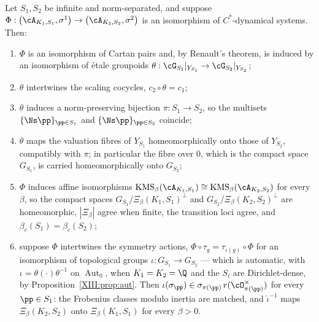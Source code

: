 \begin{theorem}\label{XIII:thm:rec}
Let $S_1,S_2$ be infinite and norm-separated, and suppose
$\Phi:\bigl(\cA_{K_1,S_1},\sigma^1\bigr)\to\bigl(\cA_{K_2,S_2},\sigma^2\bigr)$ is an
isomorphism of $C^*$-dynamical systems. Then:
\begin{enumerate}
\item $\Phi$ is an isomorphism of Cartan pairs and, by Renault's theorem, is induced by an
isomorphism of \'etale groupoids $\theta:\cG_{S_1}|_{Y_{S_1}}\to\cG_{S_2}|_{Y_{S_2}}$;
\item $\theta$ intertwines the scaling cocycles, $c_2\circ\theta=c_1$;
\item $\theta$ induces a norm-preserving bijection $\pi:S_1\to S_2$, so the multisets
$\{\Ns\pp\}_{\pp\in S_1}$ and $\{\Ns\pp\}_{\pp\in S_2}$ coincide;
\item $\theta$ maps the valuation fibres of $Y_{S_1}$ homeomorphically onto those of
$Y_{S_2}$, compatibly with $\pi$; in particular the fibre over $0$, which is the compact
space $G_{S_1}$, is carried homeomorphically onto $G_{S_2}$;
\item $\Phi$ induces affine isomorphisms $\mathrm{KMS}_\beta(\cA_{K_1,S_1})\cong\mathrm{KMS}_\beta(\cA_{K_2,S_2})$
for every $\beta$, so the compact spaces $G_{S_1}/\Xi_\beta(K_1,S_1)^\perp$ and
$G_{S_2}/\Xi_\beta(K_2,S_2)^\perp$ are homeomorphic, $|\Xi_\beta|$ agree when finite, the
transition loci agree, and $\beta_c(S_1)=\beta_c(S_2)$;
\item suppose $\Phi$ intertwines the symmetry actions, $\Phi\circ\tau_g=\tau_{\iota(g)}\circ\Phi$
for an isomorphism of topological groups $\iota:G_{S_1}\to G_{S_2}$ --- which is automatic,
with $\iota=\theta(\cdot)\theta^{-1}$ on $\operatorname{Aut}_0$, when $K_1=K_2=\Q$ and the
$S_i$ are Dirichlet-dense, by Proposition~\ref{XIII:prop:aut}. Then
$\iota(\sigma_\pp)\in\sigma_{\pi(\pp)}\,r(\cO_{\pi(\pp)}^\times)$ for every $\pp\in S_1$: the
Frobenius classes modulo inertia are matched, and $\hat\iota^{-1}$ maps
$\Xi_\beta(K_2,S_2)$ onto $\Xi_\beta(K_1,S_1)$ for every $\beta>0$.
\end{enumerate}
\end{theorem}


